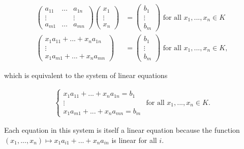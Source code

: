 \begin{deriv}
    \begin{align*}
        \begin{pmatrix}
            a_{11} & \hdots & a_{1n} \\
            \vdots & & \vdots \\
            a_{m1} & \hdots & a_{mn}
        \end{pmatrix}
        \begin{pmatrix}
            x_1 \\ \vdots \\ x_n
        \end{pmatrix}
        &=
        \begin{pmatrix}
            b_1 \\ \vdots \\ b_m
        \end{pmatrix}
        \text{ for all $x_1, ..., x_n \in K$}
        \\
        \begin{pmatrix}
            x_1 a_{11} + ... + x_n a_{1n} \\
            \vdots \\
            x_1 a_{m1} + ... + x_n a_{mn}
        \end{pmatrix}
        &=
        \begin{pmatrix}
            b_1 \\ \vdots \\ b_m
        \end{pmatrix}
        \text{ for all $x_1, ..., x_n \in K$},
    \end{align*}

    which is equivalent to the system of linear equations

    \begin{align*}
        \begin{cases}
            x_1 a_{11} + ... + x_n a_{1n} = b_1 \\
            \vdots \\
            x_1 a_{m1} + ... + x_n a_{mn} = b_m
        \end{cases}
        \text{ for all $x_1, ..., x_n \in K$}.
    \end{align*}

    Each equation in this system is itself a linear equation because the function $(x_1, ..., x_n) \mapsto x_1 a_{i1} + ... + x_n a_{in}$ is linear for all $i$.
\end{deriv}



\newpage

